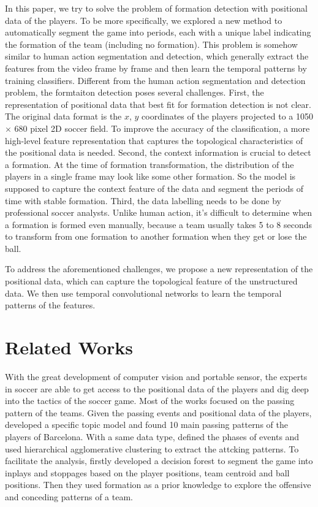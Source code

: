 \documentclass{article}
\begin{document}
In this paper, we try to solve the problem of formation detection with positional data of the players. To be more specifically, we explored a new method to automatically segment the game into periods, each with a unique label indicating the formation of the team (including no formation). This problem is somehow similar to human action segmentation and detection, which generally extract the features from the video frame by frame and then learn the temporal patterns by training classifiers\cite{lea2017temporal}. Different from the human action segmentation and detection problem, the formtaiton detection poses several challenges. First, the representation of positional data that best fit for formation detection is not clear. The original data format is the $x$, $y$ coordinates of the players projected to a 1050 $\times$ 680 pixel 2D soccer field. To improve the accuracy of the classification, a more high-level feature representation that captures the topological characteristics of the positional data is needed.
Second, the context information is crucial to detect a formation. At the time of formation transformation, the distribution of the players in a single frame may look like some other formation. So the model is supposed to capture the context feature of the data and segment the periods of time with stable formation. 
Third, the data labelling needs to be done by professional soccer analysts. Unlike human action, it's difficult to determine when a formation is formed even manually, because a team usually takes 5 to 8 seconds to transform from one formation to another formation when they get or lose the ball.

To address the aforementioned challenges, we propose a new representation of the positional data, which can capture the topological feature of the unstructured data. We then use temporal convolutional networks to learn the temporal patterns of the features.

\section{Related Works}
With the great development of computer vision and portable sensor, the experts in soccer are able to get access to the positional data of the players and dig deep into the tactics of the soccer game. Most of the works focused on the passing pattern of the teams. Given the passing events and positional data of the players, \cite{Wang:2015} developed a specific topic model and found 10 main passing patterns of the players of Barcelona. With a same data type, \cite{Decroos:2018} defined the phases of events and used hierarchical agglomerative clustering to extract the attcking patterns. To facilitate the analysis, \cite{wei2013large} firstly developed a decision forest to segment the game into inplays and stoppages based on the player positions, team centroid and ball positions. Then they used formation as a prior knowledge to explore the offensive and conceding patterns of a team. 
\end{document}
